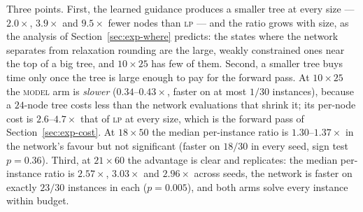 \documentclass[preprint,12pt]{elsarticle}
\begin{document}
\begin{table}[h]
\centering
{}
\caption{Branching strategy comparison on the warm-started loop, lattice stage disabled, $30$ instances per cell, mean $\pm$ standard deviation over three seeds of the per-seed median. Node counts are seed-invariant.}
\label{tab:search}
\end{table}

Three points. First, the learned guidance produces a smaller tree at every size --- $2.0\times$, $3.9\times$ and $9.5\times$ fewer nodes than \textsc{lp} --- and the ratio grows with size, as the analysis of Section~\ref{sec:exp-where} predicts: the states where the network separates from relaxation rounding are the large, weakly constrained ones near the top of a big tree, and $10\times25$ has few of them. Second, a smaller tree buys time only once the tree is large enough to pay for the forward pass. At $10\times25$ the \textsc{model} arm is \emph{slower} ($0.34$--$0.43\times$, faster on at most $1/30$ instances), because a $24$-node tree costs less than the network evaluations that shrink it; its per-node cost is $2.6$--$4.7\times$ that of \textsc{lp} at every size, which is the forward pass of Section~\ref{sec:exp-cost}. At $18\times50$ the median per-instance ratio is $1.30$--$1.37\times$ in the network's favour but not significant (faster on $18/30$ in every seed, sign test $p=0.36$). Third, at $21\times60$ the advantage is clear and replicates: the median per-instance ratio is $2.57\times$, $3.03\times$ and $2.96\times$ across seeds, the network is faster on exactly $23/30$ instances in each ($p=0.005$), and both arms solve every instance within budget.
\end{document}
